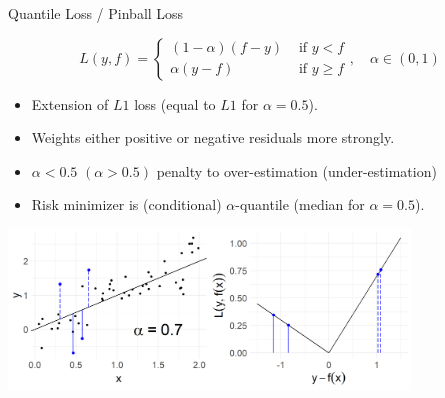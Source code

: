 \documentclass[11pt,compress,t,notes=noshow, xcolor=table]{beamer}
\begin{document}




\begin{vbframe}{Quantile Loss / Pinball Loss}
\vspace{-0.3cm}

\small
$$
L(y,f) = \begin{cases} (1 - \alpha) (f - y) & \text{ if } y < f\\
\alpha (y - f) & \text{ if } y \ge f
\end{cases}, \quad \alpha \in (0, 1)
$$


\normalsize
\begin{itemize}
\item Extension of $L1$ loss (equal to $L1$ for $\alpha = 0.5$).
\item Weights either positive or negative residuals more strongly. 
\item $\alpha<0.5$ $(\alpha>0.5)$ penalty to over-estimation (under-estimation)
\item Risk minimizer is (conditional) 
    $\alpha$-quantile (median for $\alpha=0.5$).
\end{itemize}

\vfill

\begin{center}
\includegraphics[width = 0.8\textwidth]{figure/loss_quantile.png}
\end{center}



\end{vbframe}
\end{document}
